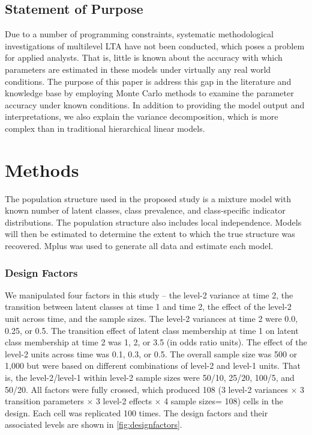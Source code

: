 \documentclass[man, noextraspace, floatsintext, 12pt]{apa7}
\begin{document}
\subsection*{Statement of Purpose}
Due to a number of programming constraints, systematic methodological investigations of multilevel LTA have not been conducted, which poses a problem for applied analysts. That is, little is known about the accuracy with which parameters are estimated in these models under virtually any real world conditions. The purpose of this paper is address this gap in the literature and knowledge base by employing Monte Carlo methods to examine the parameter accuracy under known conditions. In addition to providing the model output and interpretations, we also explain the variance decomposition, which is more complex than in traditional hierarchical linear models.

\section*{Methods}
The population structure used in the proposed study is a mixture model with known number of latent classes, class prevalence, and class-specific indicator distributions. The population structure also includes local independence. Models will then be estimated to determine the extent to which the true structure was recovered.  Mplus was used to generate all data and estimate each model. 

\subsubsection*{Design Factors}
We manipulated four factors in this study -- the level-2 variance at time 2, the transition between latent classes at time 1 and time 2, the effect of the level-2 unit across time, and the sample sizes. The level-2 variances at time 2 were 0.0, 0.25, or 0.5. The transition effect of latent class membership at time 1 on latent class membership at time 2 was 1, 2, or 3.5 (in odds ratio units). The effect of the level-2 units across time was 0.1, 0.3, or 0.5. The overall sample size was 500 or 1,000 but were based on different combinations of level-2 and level-1 units. That is, the level-2/level-1 within level-2 sample sizes were 50/10, 25/20, 100/5, and 50/20. All factors were fully crossed, which produced 108 (3 level-2 variances $\times$ 3 transition parameters $\times$ 3 level-2 effects $\times$ 4 sample sizes= 108) cells in the design. Each cell was replicated 100 times. The design factors and their associated levels are shown in \autoref{fig:designfactors}.
\end{document}
